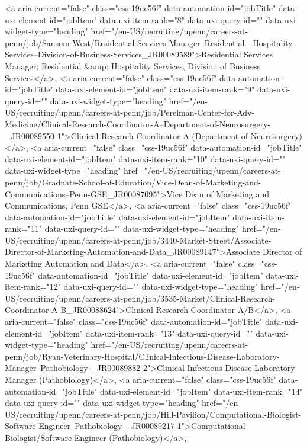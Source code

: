 <a aria-current="false" class="css-19uc56f" data-automation-id="jobTitle" data-uxi-element-id="jobItem" data-uxi-item-rank="8" data-uxi-query-id="" data-uxi-widget-type="heading" href="/en-US/recruiting/upenn/careers-at-penn/job/Sansom-West/Residential-Services-Manager--Residential---Hospitality-Services--Division-of-Business-Services_JR00089589">Residential Services Manager; Residential &amp; Hospitality Services, Division of Business Services</a>, <a aria-current="false" class="css-19uc56f" data-automation-id="jobTitle" data-uxi-element-id="jobItem" data-uxi-item-rank="9" data-uxi-query-id="" data-uxi-widget-type="heading" href="/en-US/recruiting/upenn/careers-at-penn/job/Perelman-Center-for-Adv-Medicine/Clinical-Research-Coordinator-A--Department-of-Neurosurgery-_JR00089550-1">Clinical Research Coordinator A (Department of Neurosurgery)</a>, 
<a aria-current="false" class="css-19uc56f" data-automation-id="jobTitle" data-uxi-element-id="jobItem" data-uxi-item-rank="10" data-uxi-query-id="" data-uxi-widget-type="heading" href="/en-US/recruiting/upenn/careers-at-penn/job/Graduate-School-of-Education/Vice-Dean-of-Marketing-and-Communications--Penn-GSE_JR00087095">Vice Dean of Marketing and Communications, Penn GSE</a>, 
<a aria-current="false" class="css-19uc56f" data-automation-id="jobTitle" data-uxi-element-id="jobItem" data-uxi-item-rank="11" data-uxi-query-id="" data-uxi-widget-type="heading" href="/en-US/recruiting/upenn/careers-at-penn/job/3440-Market-Street/Associate-Director-of-Marketing-Automation-and-Data_JR00089147">Associate Director of Marketing Automation and Data</a>, 
<a aria-current="false" class="css-19uc56f" data-automation-id="jobTitle" data-uxi-element-id="jobItem" data-uxi-item-rank="12" data-uxi-query-id="" data-uxi-widget-type="heading" href="/en-US/recruiting/upenn/careers-at-penn/job/3535-Market/Clinical-Research-Coordinator-A-B_JR00088624">Clinical Research Coordinator A/B</a>, <a aria-current="false" class="css-19uc56f" data-automation-id="jobTitle" data-uxi-element-id="jobItem" data-uxi-item-rank="13" data-uxi-query-id="" data-uxi-widget-type="heading" href="/en-US/recruiting/upenn/careers-at-penn/job/Ryan-Veterinary-Hospital/Clinical-Infectious-Disease-Laboratory-Manager--Pathobiology-_JR00089882-2">Clinical Infectious Disease Laboratory Manager (Pathobiology)</a>, 
<a aria-current="false" class="css-19uc56f" data-automation-id="jobTitle" data-uxi-element-id="jobItem" data-uxi-item-rank="14" data-uxi-query-id="" data-uxi-widget-type="heading" href="/en-US/recruiting/upenn/careers-at-penn/job/Hill-Pavilion/Computational-Biologist-Software-Engineer--Pathobiology-_JR00089217-1">Computational Biologist/Software Engineer (Pathobiology)</a>, 
